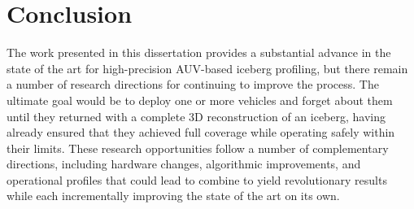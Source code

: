 \section{Conclusion}

The work presented in this dissertation provides a substantial advance in the state of the art for high-precision AUV-based iceberg profiling, but there remain a number of research directions for continuing to improve the process. The ultimate goal would be to deploy one or more vehicles and forget about them until they returned with a complete 3D reconstruction of an iceberg, having already ensured that they achieved full coverage while operating safely within their limits. These research opportunities follow a number of complementary directions, including hardware changes, algorithmic improvements, and operational profiles that could lead to combine to yield revolutionary results while each incrementally improving the state of the art on its own. 